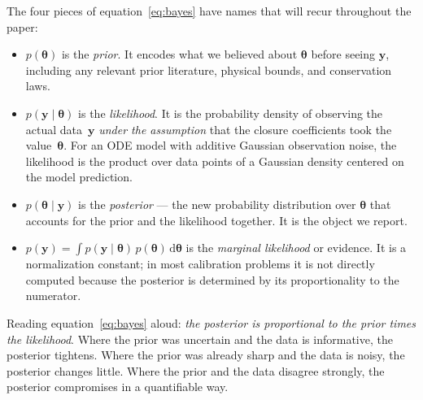 \documentclass[12pt]{article}
\theoremstyle{plain}
\theoremstyle{definition}
\theoremstyle{remark}
\renewcommand{\d}{\mathrm{d}}
\begin{document}
The four pieces of equation~\eqref{eq:bayes} have names that will recur
throughout the paper:
%
\begin{itemize}
\item $p(\boldsymbol{\theta})$ is the \emph{prior}.  It encodes what we
believed about $\boldsymbol{\theta}$ before seeing $\mathbf{y}$, including any
relevant prior literature, physical bounds, and conservation laws.
\item $p(\mathbf{y}\mid\boldsymbol{\theta})$ is the \emph{likelihood}.  It is
the probability density of observing the actual data~$\mathbf{y}$ \emph{under
the assumption} that the closure coefficients took the value~$\boldsymbol{\theta}$.
For an ODE model with additive Gaussian observation noise, the likelihood is
the product over data points of a Gaussian density centered on the model
prediction.
\item $p(\boldsymbol{\theta}\mid\mathbf{y})$ is the \emph{posterior} —
the new probability distribution over $\boldsymbol{\theta}$ that accounts for
the prior and the likelihood together.  It is the object we report.
\item $p(\mathbf{y}) = \int p(\mathbf{y}\mid\boldsymbol{\theta})
\,p(\boldsymbol{\theta})\,\d\boldsymbol{\theta}$ is the \emph{marginal
likelihood} or evidence.  It is a normalization constant; in most calibration
problems it is not directly computed because the posterior is determined by
its proportionality to the numerator.
\end{itemize}

Reading equation~\eqref{eq:bayes} aloud: \emph{the posterior is proportional
to the prior times the likelihood}.  Where the prior was uncertain and the
data is informative, the posterior tightens.  Where the prior was already
sharp and the data is noisy, the posterior changes little.  Where the prior
and the data disagree strongly, the posterior compromises in a quantifiable
way.
\end{document}
